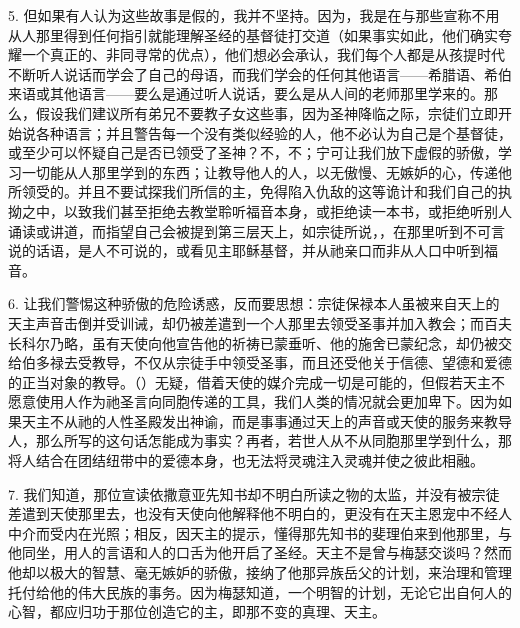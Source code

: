 5. 但如果有人认为这些故事是假的，我并不坚持。因为，我是在与那些宣称不用从人那里得到任何指引就能理解圣经的基督徒打交道（如果事实如此，他们确实夸耀一个真正的、非同寻常的优点），他们想必会承认，我们每个人都是从孩提时代不断听人说话而学会了自己的母语，而我们学会的任何其他语言——希腊语、希伯来语或其他语言——要么是通过听人说话，要么是从人间的老师那里学来的。那么，假设我们建议所有弟兄不要教子女这些事，因为圣神降临之际，宗徒们立即开始说各种语言；并且警告每一个没有类似经验的人，他不必认为自己是个基督徒，或至少可以怀疑自己是否已领受了圣神？不，不；宁可让我们放下虚假的骄傲，学习一切能从人那里学到的东西；让教导他人的人，以无傲慢、无嫉妒的心，传递他所领受的。并且不要试探我们所信的主，免得陷入仇敌的这等诡计和我们自己的执拗之中，以致我们甚至拒绝去教堂聆听福音本身，或拒绝读一本书，或拒绝听别人诵读或讲道，而指望自己会被提到第三层天上，如宗徒所说，，在那里听到不可言说的话语，是人不可说的，或看见主耶稣基督，并从祂亲口而非从人口中听到福音。\par

6. 让我们警惕这种骄傲的危险诱惑，反而要思想：宗徒保禄本人虽被来自天上的天主声音击倒并受训诫，却仍被差遣到一个人那里去领受圣事并加入教会；而百夫长科尔乃略，虽有天使向他宣告他的祈祷已蒙垂听、他的施舍已蒙纪念，却仍被交给伯多禄去受教导，不仅从宗徒手中领受圣事，而且还受他关于信德、望德和爱德的正当对象的教导。（）无疑，借着天使的媒介完成一切是可能的，但假若天主不愿意使用人作为祂圣言向同胞传递的工具，我们人类的情况就会更加卑下。因为如果天主不从祂的人性圣殿发出神谕，而是事事通过天上的声音或天使的服务来教导人，那么所写的这句话怎能成为事实？再者，若世人从不从同胞那里学到什么，那将人结合在团结纽带中的爱德本身，也无法将灵魂注入灵魂并使之彼此相融。\par

7. 我们知道，那位宣读依撒意亚先知书却不明白所读之物的太监，并没有被宗徒差遣到天使那里去，也没有天使向他解释他不明白的，更没有在天主恩宠中不经人中介而受内在光照；相反，因天主的提示，懂得那先知书的斐理伯来到他那里，与他同坐，用人的言语和人的口舌为他开启了圣经。天主不是曾与梅瑟交谈吗？然而他却以极大的智慧、毫无嫉妒的骄傲，接纳了他那异族岳父的计划，来治理和管理托付给他的伟大民族的事务。因为梅瑟知道，一个明智的计划，无论它出自何人的心智，都应归功于那位创造它的主，即那不变的真理、天主。\par

